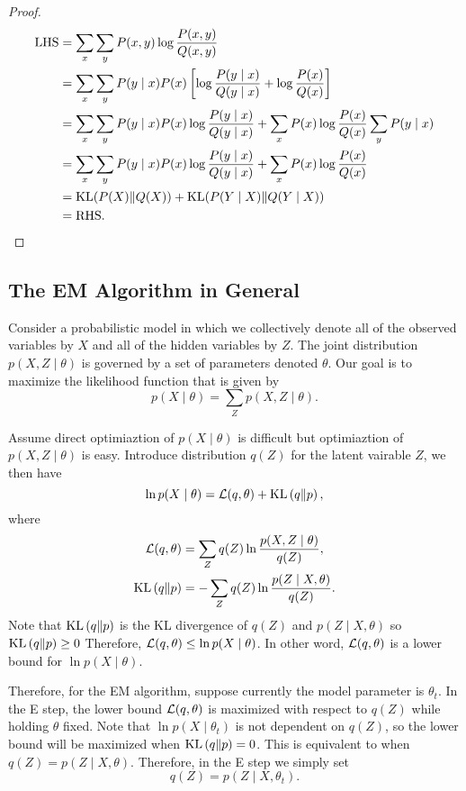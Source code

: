 \documentclass[a4paper]{article}
\begin{document}
\begin{proof}
\[
\begin{aligned}
  \text{LHS} &= \sum_x \sum_y P(x,y) \log \frac{P(x,y)}{Q(x,y)} \\
  &= \sum_x \sum_y P(y \mid x) P(x) \left[ \log 
  \frac{P(y \mid x)}{Q(y \mid x)} + \log \frac{P(x)}{Q(x)} \right] \\
  &= \sum_x \sum_y P(y \mid x) P(x) \log 
  \frac{P(y \mid x)}{Q(y \mid x)} + \sum_x P(x) \log 
  \frac{P(x)}{Q(x)} \sum_y P(y \mid x) \\
  &= \sum_x \sum_y P(y \mid x) P(x) \log \frac{P(y \mid x)}
  {Q(y \mid x)} + \sum_x P(x) \log \frac{P(x)}{Q(x)} \\
  &= \operatorname{KL}({P(X)} \Vert {Q(X)}) + \operatorname{KL}({P(Y \mid X)} \Vert {Q(Y \mid X)}) \\
  &= \text{RHS}.
\end{aligned}
\]
\end{proof}

\subsection{The EM Algorithm in General}

Consider a probabilistic model in which we collectively 
denote all of the observed variables by $X$ and all of 
the hidden variables by $Z$. The joint distribution 
$p(X, Z \mid \theta)$ is governed by a set of parameters 
denoted $\theta$. Our goal is to maximize the likelihood 
function that is given by
\[
p(X \mid \theta) = \sum_Z p(X, Z \mid \theta).
\]

Assume direct optimiaztion of $p(X \mid \theta)$ is difficult
but optimiaztion of $p(X, Z \mid \theta)$ is easy.
Introduce distribution $q(Z)$ for the latent vairable $Z$,
we then have 
\[
\ln p(X \mid \theta) = \mathcal{L}(q, \theta) + \mathrm{KL}\left(q \Vert p \right),
\]
where 
\[
\begin{aligned}
  \mathcal{L}(q, \theta) &= \sum_Z q(Z) \ln \frac{p(X, Z \mid \theta)}{q(Z)}, \\
  \mathrm{KL}\left(q \Vert p \right) &= - \sum_Z q(Z) \ln \frac{p(Z \mid X, \theta)}{q(Z)}.
\end{aligned}
\]
Note that $\mathrm{KL}\left(q \Vert p \right)$ is the KL divergence of $q(Z)$
and $p(Z \mid X, \theta)$ so $\mathrm{KL}\left(q \Vert p \right) \geq 0$
Therefore, $\mathcal{L}(q, \theta) \leq \ln p(X \mid \theta)$. In other word,
$\mathcal{L}(q, \theta)$ is a lower bound for $\ln p(X \mid \theta)$.

Therefore, for the EM algorithm, suppose currently the model 
parameter is $\theta_t$. In the E step, the lower bound 
$\mathcal{L}(q, \theta)$ is maximized with respect to $q(Z)$ while 
holding $\theta$ fixed. Note that $\ln p(X \mid \theta_t)$
is not dependent on $q(Z)$, so the lower bound will 
be maximized when $\mathrm{KL}\left(q \Vert p \right) = 0$. This is equivalent to
when $q(Z) = p(Z \mid X, \theta)$. Therefore, in the E 
step we simply set
\[
q(Z) = p(Z \mid X, \theta_t).
\]
\end{document}
